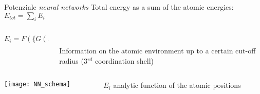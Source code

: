 \documentclass{beamer}
\begin{document}
\begin{frame}{Potenziale \emph{neural networks}}
 \centering
Total energy as a sum of the atomic energies: $E_{tot} = \sum_i E_i$
\begin{flushright}
{}
\end{flushright}
\vspace{3ex}
\begin{columns}[c]
\begin{column}{0.50\textwidth}
\begin{displaymath}
E_i = F(\{G(\bar{x})\}) 
\end{displaymath}
\end{column}

\begin{column}{0.50\textwidth}
\centering
{}\\
Information on the atomic environment
up to a certain cut-off radius
(3$^{rd}$ coordination shell)
\end{column}
\end{columns}
\begin{columns}[c]
\begin{column}{0.50\textwidth}
\centering
\texttt{[image: NN\_schema]}
\end{column}
\begin{column}{0.50\textwidth}
$E_i$ analytic function of the atomic positions
\end{column}
\end{columns}
\end{frame}
\end{document}
